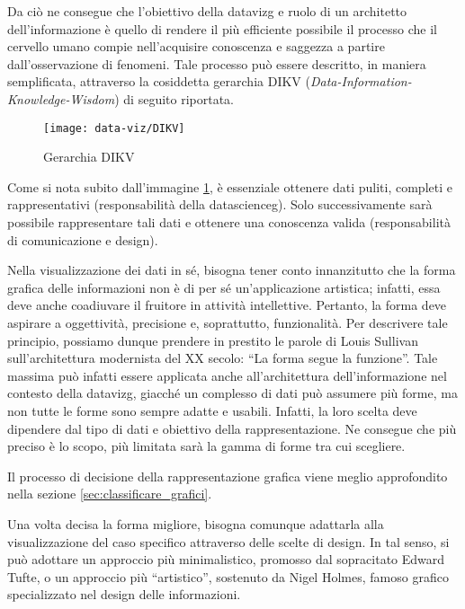 Da ciò ne consegue che l'obiettivo della \gls{datavizg} e ruolo di un architetto dell'informazione è quello di rendere il più efficiente possibile il processo che il cervello
umano compie nell'acquisire conoscenza e saggezza a partire dall'osservazione di fenomeni.
Tale processo può essere descritto, in maniera semplificata, attraverso la cosiddetta gerarchia DIKV (\emph{Data-Information-Knowledge-Wisdom}) di seguito riportata.
\begin{figure}[!h] 
    \centering 
    \texttt{[image: data-viz/DIKV]} 
    \caption{Gerarchia DIKV}
    \label{fig:DIKV}
\end{figure}

Come si nota subito dall'immagine \ref{fig:DIKV}, è essenziale ottenere dati puliti, completi e rappresentativi (responsabilità della \gls{datascienceg}). Solo successivamente sarà possibile rappresentare tali dati e 
ottenere una conoscenza valida (responsabilità di comunicazione e design).

\bigskip
\noindent Nella visualizzazione dei dati in sé, bisogna tener conto innanzitutto che la forma grafica delle informazioni non è di per sé un'applicazione artistica; infatti, 
essa deve anche coadiuvare il fruitore in attività intellettive. Pertanto, la forma deve aspirare a oggettività, precisione e, soprattutto, funzionalità.
Per descrivere tale principio, possiamo dunque prendere in prestito le parole di Louis Sullivan sull'architettura modernista del XX secolo: ``La forma segue la funzione''. 
Tale massima può infatti essere applicata anche all'architettura dell'informazione nel contesto della \gls{datavizg}, giacché
un complesso di dati può assumere più forme, ma non tutte le forme sono sempre adatte e usabili. Infatti, la loro scelta deve dipendere dal
tipo di dati e obiettivo della rappresentazione. Ne consegue che più preciso è lo scopo, più limitata sarà la gamma di forme tra cui scegliere.

Il processo di decisione della rappresentazione grafica viene meglio approfondito nella sezione \ref{sec:classificare_grafici}.

\bigskip
\noindent Una volta decisa la forma migliore, bisogna comunque adattarla alla visualizzazione del caso specifico attraverso delle scelte di design.
In tal senso, si può adottare un approccio più minimalistico, promosso dal sopracitato Edward Tufte, o un approccio più ``artistico'', 
sostenuto da Nigel Holmes, famoso grafico specializzato nel design delle informazioni.

